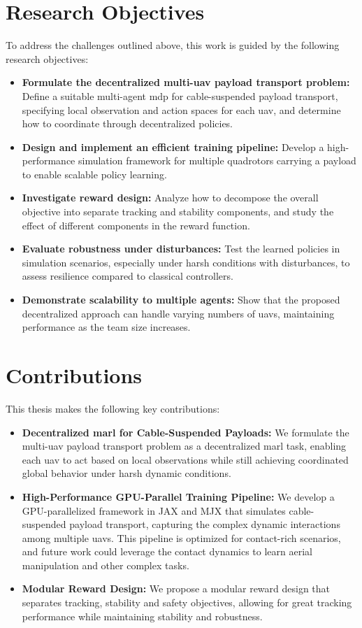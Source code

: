 \section{Research Objectives}
To address the challenges outlined above, this work is guided by the following research objectives:
\begin{itemize}
    \item \textbf{Formulate the decentralized multi-\gls{uav} payload transport problem:} Define a suitable multi-agent \gls{mdp} for cable-suspended payload transport, specifying local observation and action spaces for each \gls{uav}, and determine how to coordinate through decentralized policies.
    \item \textbf{Design and implement an efficient training pipeline:} Develop a high-performance simulation framework for multiple quadrotors carrying a payload to enable scalable policy learning.
    \item \textbf{Investigate reward design:} Analyze how to decompose the overall objective into separate tracking and stability components, and study the effect of different components in the reward function.
    \item \textbf{Evaluate robustness under disturbances:} Test the learned policies in simulation scenarios, especially under harsh conditions with disturbances, to assess resilience compared to classical controllers.
    \item \textbf{Demonstrate scalability to multiple agents:} Show that the proposed decentralized approach can handle varying numbers of \glspl{uav}, maintaining performance as the team size increases.
\end{itemize}
\section{Contributions}
This thesis makes the following key contributions:
\begin{itemize}
    \item \textbf{Decentralized \gls{marl} for Cable-Suspended Payloads:} We formulate the multi-\gls{uav} payload transport problem as a decentralized \gls{marl} task, enabling each \gls{uav} to act based on local observations while still achieving coordinated global behavior under harsh dynamic conditions.
    \item \textbf{High-Performance GPU-Parallel Training Pipeline:} We develop a GPU-parallelized framework in JAX and MJX that simulates cable-suspended payload transport, capturing the complex dynamic interactions among multiple \glspl{uav}. This pipeline is optimized for contact-rich scenarios, and future work could leverage the contact dynamics to learn aerial manipulation and other complex tasks.
    \item \textbf{Modular Reward Design:} We propose a modular reward design that separates tracking, stability and safety objectives, allowing for great tracking performance while maintaining stability and robustness. 
\end{itemize}

